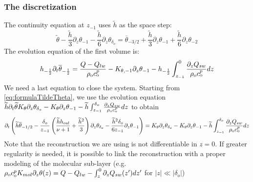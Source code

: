 \subsubsection*{The discretization}
The continuity equation at $z_{-1}$
uses $\widetilde{h}$
as the space step:
\begin{equation}
    \widetilde{\theta}
    - \frac{\widetilde{h}}{3}
    \partial_z \theta_{-1}
    - \frac{\widetilde{h}}{6}
    \partial_z \theta_{\delta_o}
    = \overline{\theta}_{-3/2}
    + \frac{\widetilde{h}}{3}
    \partial_z \theta_{-1}
    + \frac{\widetilde{h}}{6}
    \partial_z \theta_{-2}
\end{equation}
The evolution equation of the first volume is:
\begin{equation}
h_{-\frac{1}{2}}\partial_t
\overline{\theta}_{-\frac{1}{2}} =
	\frac{Q - Q_{lw}}{\rho_{\rm o} c_{\rm o}^p}
- K_{\theta, -1} \partial_z \theta_{-1}
- h_{-\frac{1}{2}}\int_{z_{-1}}^0
	\frac{\partial_z Q_{sw}}{\rho_{\rm o} c_{\rm o}^p} dz
\end{equation}
We need a last equation to close the system.
Starting from \eqref{eq:formulaTildeTheta}, we use the
evolution equation
$\widetilde{h}\partial_t \widetilde{\theta}K_\theta \partial_z
\theta_{\delta_o}- K_\theta\partial_z \theta_{-1} - \widetilde{h}
\int^{\delta_o}_{z_{-1}}
	\frac{\partial_z Q_{sw}}{\rho_{\rm o} c_{\rm o}^p} dz$
to obtain
\begin{equation}
\partial_t
\left(
\widetilde{h}\overline{\theta}_{-1/2}
	-\frac{\delta_o}{z_{-1}}\left(
\frac{\widetilde{h}h_{osl}}{\nu+1} + \frac{\widetilde{h}^2}{3}
\right)\partial_z \theta_{\delta_o}
	- \frac{\widetilde{h}^2\delta_o}{6z_{-1}}
\partial_z \theta_{-1}
\right)
	= K_\theta\partial_z \theta_{\delta_o}-
K_\theta\partial_z \theta_{-1}
- \widetilde{h}
\int^{\delta_o}_{z_{-1}}
	\frac{\partial_z Q_{sw}}{\rho_{\rm o} c_{\rm o}^p} dz
\end{equation}
Note that the reconstruction we are using is not differentiable
in $z=0$.
If greater regularity is needed, it is possible to link
the reconstruction with a proper modeling of the molecular sub-layer
(e.g. $\rho_{\rm o} c_{\rm o}^p K_{mol} \partial_z \theta(z) =
Q - Q_{lw} - \int_z^0 \partial_z Q_{sw}(z')dz'$ for $|z|\ll|\delta_o|$)

